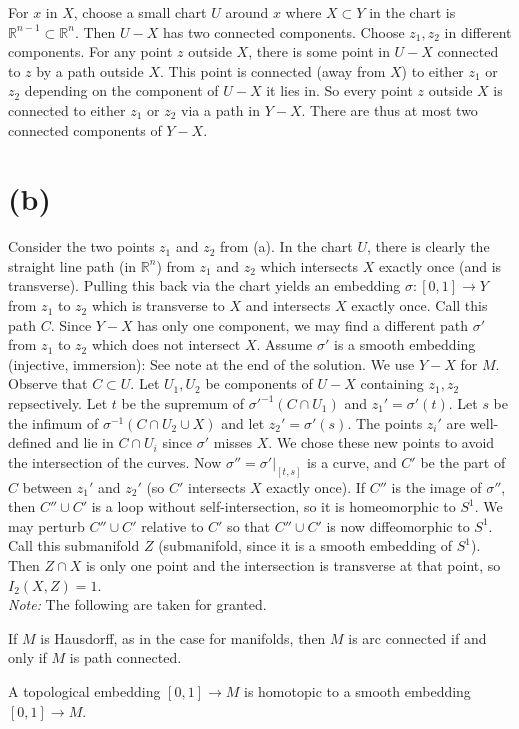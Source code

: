 \documentclass{amsbook}
\theoremstyle{theorem}
\theoremstyle{plain}
\theoremstyle{remark}
\newcommand{\R}{\mathbb R}
\begin{document}
For $x$ in $X$, choose a small chart $U$ around $x$ where $X\subset Y$ in the chart is $\R^{n-1}\subset \R^n$. Then $U-X$ has two connected components. Choose $z_1, z_2$ in different components. For any point $z$ outside $X$, there is some point in $U-X$ connected to $z$ by a path outside $X$. This point is connected (away from $X$) to either $z_1$ or $z_2$ depending on the component of $U-X$ it lies in. So every point $z$ outside $X$ is connected to either $z_1$ or $z_2$ via a path in $Y - X$. There are thus at most two connected components of $Y-X$.

\section*{(b)}

Consider the two points $z_1$ and $z_2$ from (a). In the chart $U$, there is clearly the straight line path (in $\R^n$) from $z_1$ and $z_2$ which intersects $X$ exactly once (and is transverse). Pulling this back via the chart yields an embedding $\sigma:[0,1] \to Y$ from $z_1$ to $z_2$ which is transverse to $X$ and intersects $X$ exactly once. Call this path $C$. Since $Y-X$ has only one component, we may find a different path $\sigma'$ from $z_1$ to $z_2$ which does not intersect $X$. Assume $\sigma'$ is a smooth embedding (injective, immersion): See note at the end of the solution. We use $Y-X$ for $M$.\\

Observe that $C\subset U$. Let $U_1, U_2$ be components of $U-X$ containing $z_1,z_2$ repsectively. Let $t$ be the supremum of $\sigma'^{-1}(C\cap U_1)$ and $z_1' = \sigma'(t)$. Let $s$ be the infimum of $\sigma^{-1}(C\cap U_2 \cup X)$ and let $z_2' = \sigma'(s)$. The points $z_i'$ are well-defined and lie in $C\cap U_i$ since $\sigma'$ misses $X$. We chose these new points to avoid the intersection of the curves. Now $\sigma'' = \sigma'|_{[t,s]}$ is a curve, and $C'$ be the part of $C$ between $z_1'$ and $z_2'$ (so $C'$ intersects $X$ exactly once). If $C''$ is the image of $\sigma''$, then $C'' \cup C'$ is a loop without self-intersection, so it is homeomorphic to $S^1$. We may perturb $C''\cup C'$  relative to $C'$ so that $C'' \cup C'$ is now diffeomorphic to $S^1$. Call this submanifold $Z$ (submanifold, since it is a smooth embedding of $S^1$). Then $Z\cap X$ is only one point and the intersection is transverse at that point, so $I_2(X,Z) = 1$.\\

\textit{Note:} The following are taken for granted.
\begin{theorem}
  If $M$ is Hausdorff, as in the case for manifolds, then $M$ is arc connected if and only if $M$ is path connected.
\end{theorem}
\begin{lemma}
  A topological embedding $[0,1]\to M$ is homotopic to a smooth embedding $[0,1]\to M$.
\end{lemma}
\end{document}
